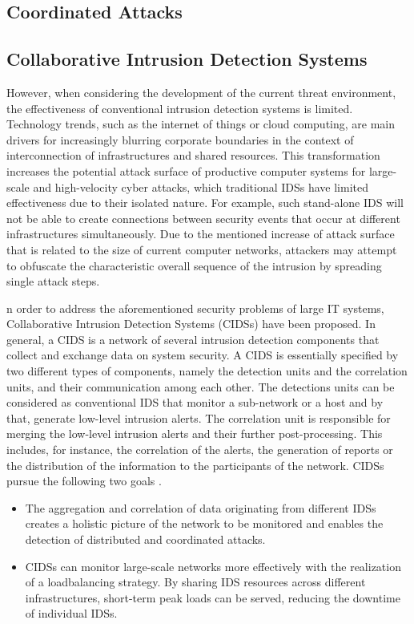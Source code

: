 \subsection{Coordinated Attacks}

\subsection{Collaborative Intrusion Detection Systems}

However, when considering the development of the current threat environment, the effectiveness of conventional intrusion detection systems is limited. Technology trends, such as the internet of things or cloud computing, are main drivers for increasingly blurring corporate boundaries in the context of interconnection of infrastructures and shared resources. This transformation increases the potential attack surface of productive computer systems for large-scale and high-velocity cyber attacks, which traditional IDSs have limited effectiveness due to their isolated nature. For example, such stand-alone IDS will not be able to create connections between security events that occur at different infrastructures simultaneously. Due to the mentioned increase of attack surface that is related to the size of current computer networks, attackers may attempt to obfuscate the characteristic overall sequence of the intrusion by spreading single attack steps.

n order to address the aforementioned security problems of large IT systems, Collaborative Intrusion Detection Systems (CIDSs) have been proposed. In general, a CIDS is a network of several intrusion detection components that collect and exchange data on system security. A CIDS is essentially specified by two different types of components, namely the detection units and the correlation units, and their communication among each other. The detections units can be considered as conventional IDS that monitor a sub-network or a host and by that, generate low-level intrusion alerts. The correlation unit is responsible for merging the low-level intrusion alerts and their further post-processing. This includes, for instance, the correlation of the alerts, the generation of reports or the distribution of the information to the participants of the network. CIDSs pursue the following two goals \cite[24]{vasilomanolakis_collaborative_2016}.

\begin{itemize}
    \item The aggregation and correlation of data originating from different IDSs creates a holistic picture of the network to be monitored and enables the detection of distributed and coordinated attacks.
    \item CIDSs can monitor large-scale networks more effectively with the realization of a loadbalancing strategy. By sharing IDS resources across different infrastructures, short-term peak loads can be served, reducing the downtime of individual IDSs.
\end{itemize}